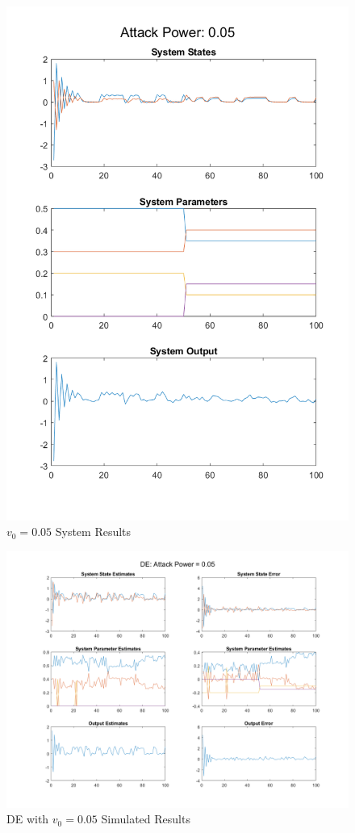 \documentclass[]{article}
\begin{document}
\begin{figure}
	\centering
	\includegraphics[width=0.7\linewidth]{../../fig/SystemResponse_attack_0_05}
	\caption{$v_0 = 0.05$ System Results}
	\label{fig:systemresponseattack005}
\end{figure}

\begin{figure}
	\centering
	\includegraphics[width=\linewidth]{../../fig/DE_attack_0_05}
	\caption{DE with $v_0 = 0.05$ Simulated Results}
	\label{fig:deattack005}
\end{figure}
\end{document}
